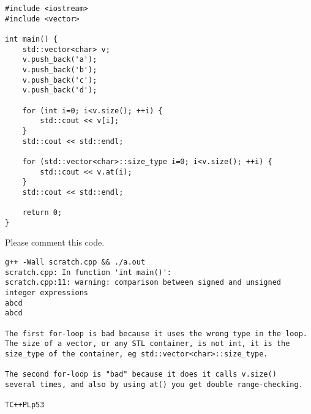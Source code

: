 \documentclass[landscape]{slides}
\begin{document}
\begin{slide}
\begin{lstlisting}
#include <iostream>
#include <vector>

int main() {
    std::vector<char> v;
    v.push_back('a');
    v.push_back('b');
    v.push_back('c');
    v.push_back('d');

    for (int i=0; i<v.size(); ++i) {
        std::cout << v[i];
    }
    std::cout << std::endl;

    for (std::vector<char>::size_type i=0; i<v.size(); ++i) {
        std::cout << v.at(i);
    }
    std::cout << std::endl;

    return 0;
}
\end{lstlisting}

Please comment this code.

\begin{note}
\begin{tiny}
\begin{verbatim}
g++ -Wall scratch.cpp && ./a.out
scratch.cpp: In function 'int main()':
scratch.cpp:11: warning: comparison between signed and unsigned integer expressions
abcd
abcd

The first for-loop is bad because it uses the wrong type in the loop.
The size of a vector, or any STL container, is not int, it is the
size_type of the container, eg std::vector<char>::size_type.

The second for-loop is "bad" because it does it calls v.size()
several times, and also by using at() you get double range-checking.

TC++PLp53
\end{verbatim}
\end{tiny}
\end{note}
\end{slide}

\end{document}
